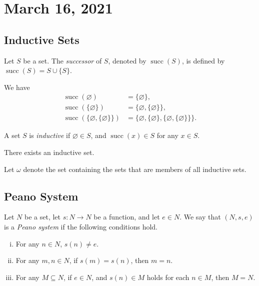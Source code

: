 \documentclass[11pt]{article}
\DeclareMathOperator{\suc}{succ}
\begin{document}
\section{March 16, 2021}
\subsection{Inductive Sets}
\begin{definition}
  Let $S$ be a set.
  The \emph{successor} of $S$, denoted by $\suc(S)$, is defined by $\suc(S) = S \cup \{S\}$.
\end{definition}

\begin{example}
  We have
  \begin{align*}
    \suc(\varnothing) &= \{\varnothing\}, \\
    \suc(\{\varnothing\}) &= \{\varnothing, \{\varnothing\}\}, \\
    \suc(\{\varnothing, \{\varnothing\}\}) &= \{\varnothing, \{\varnothing\}, \{\varnothing, \{\varnothing\}\}\}.
  \end{align*}
\end{example}

\begin{definition}
  A set $S$ is \emph{inductive} if $\varnothing \in S$, and $\suc(x) \in S$ for any $x \in S$.
\end{definition}

\begin{axiom}[Infinity]
  There exists an inductive set.
\end{axiom}

\begin{definition}
  Let $\omega$ denote the set containing the sets that are members of all inductive sets.
\end{definition}

\subsection{Peano System}
\begin{definition}
  Let $N$ be a set, let $s: N \to N$ be a function, and let $e \in N$.
  We say that $(N, s, e)$ is a \emph{Peano system} if the following conditions hold.
  \begin{enumerate}[(i)]
    \item For any $n \in N$, $s(n) \neq e$.
    \item For any $m, n \in N$, if $s(m) = s(n)$, then $m = n$.
    \item For any $M \subseteq N$, if $e \in N$, and $s(n) \in M$ holds for each $n \in M$, then $M = N$.
  \end{enumerate}
\end{definition}
\end{document}
